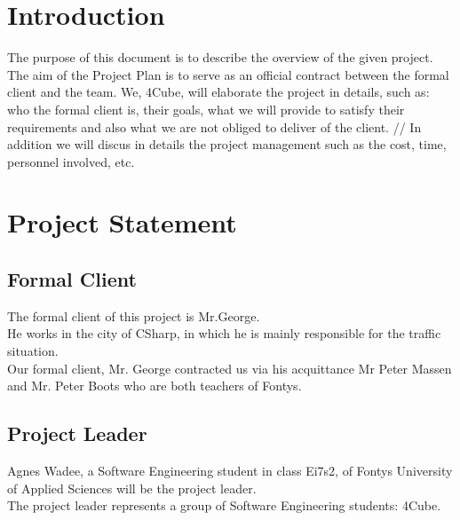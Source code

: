 \documentclass[a4paper,11pt]{article}
\title{\Title}
\author{}
\date{\today}
\begin{document}
\begin{titlepage}
\maketitle
\end{titlepage}

  	\linespread{1.15} %
    
  	
  	\tableofcontents
  	\newpage
  	\section{Introduction}
  	The purpose of this document is to describe the overview of the given project. The aim of the Project Plan is to serve as an official contract between the formal client and the team. We, 4Cube, will elaborate the project in details, such as: who the formal client is, their goals, what we will provide to satisfy their requirements and also what we are not obliged to deliver of the client. // In addition we will discus in details the project management such as the cost, time, personnel involved, etc.  
  	
  	\section{Project Statement }
  	\subsection{Formal Client}
  	The formal client of this project is Mr.George. \\ He works in the city of CSharp, in which he is mainly responsible for the traffic situation. \\
  	Our formal client, Mr. George contracted us via his acquittance Mr Peter Massen and Mr. Peter Boots who are both teachers of Fontys. 
  	
    \subsection{Project Leader}
    Agnes Wadee, a Software Engineering student in class Ei7s2, of Fontys University of Applied Sciences will be the project leader. \\ The project leader represents a group of Software Engineering students: 4Cube.
    
\end{document}
